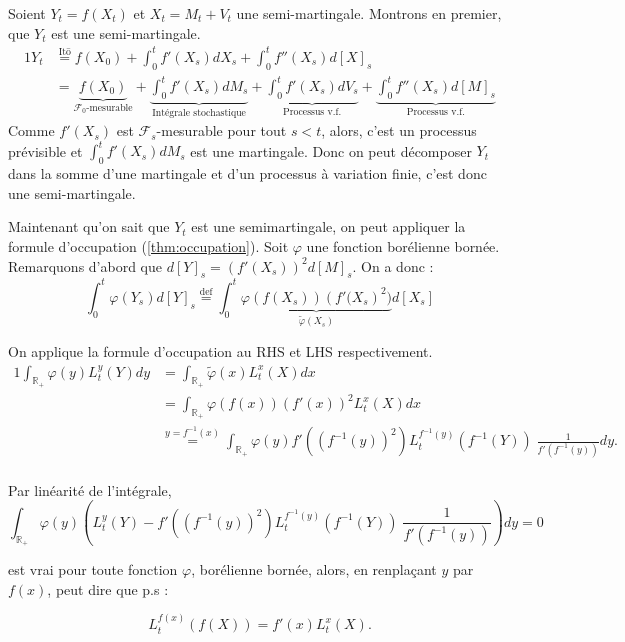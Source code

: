 \documentclass[openany]{book}
\makeatletter
\newcommand{\F}{\mathscr{F}}
\newcommand{\R}{\mathbb{R}}
\newcommand{\1}{\mathbbm{1}}
\renewenvironment{proof}[1][\textbf{\textit{Démonstration}}]{%
  \par\pushQED{\qed}%
  \normalfont\itshape\topsep6\p@\@plus6\p@\relax
  \trivlist\item[\hskip\labelsep
    #1\@addpunct{.}]\ignorespaces
}{%
  \popQED\endtrivlist\@endpefalse
}
\theoremstyle{thmfont}
\theoremstyle{deffont}
\theoremstyle{thmfont}
\theoremstyle{deffont}
\makeatother
\begin{document}
\begin{proof}
  Soient $Y_t = f(X_t)$ et $X_t = M_t + V_t$ une semi-martingale. Montrons en premier, que $Y_t$ est une semi-martingale. 
  \begin{alignat*}{1}
    Y_t &\overset{\text{Itō}}{=} f(X_0) + \int_0^t f'(X_s) dX_s + \int_0^t f''(X_s) d[X]_s\\
        &= \underbrace{f(X_0)}_{\F_0\text{-mesurable}} + \underbrace{\int_0^t f'(X_s) dM_s}_{\text{Intégrale stochastique}} + \underbrace{\int_0^t f'(X_s) dV_s}_{\text{Processus v.f.}} + \underbrace{\int_0^t f''(X_s) d[M]_s}_{\text{Processus v.f.}}
  \end{alignat*}
  Comme $f'(X_s)$ est $\F_s$-mesurable pour tout $s<t$, alors, c'est un processus prévisible et $\int_0^t f'(X_s) dM_s$ est une martingale.
  Donc on peut décomposer $Y_t$ dans la somme d'une martingale et d'un processus à variation finie, c'est donc une semi-martingale.


  
Maintenant qu'on sait que $Y_t$ est une semimartingale, on peut appliquer la formule d'occupation (\autoref{thm:occupation}). Soit $\varphi$ une fonction borélienne bornée. Remarquons d'abord que $d[Y]_s = \left(f'(X_s)\right)^2 d[M]_s$. On a donc :
$$  \int_0^t \varphi(Y_s) d[Y]_s \overset{\text{def}}{=} \int_0^t \underbrace{\varphi(f(X_s)) \left(f'(X_s\right)^2)}_{\tilde\varphi(X_s)} d[X_s]
$$

On applique la formule d'occupation au RHS et LHS respectivement.
\begin{alignat*}{1}
\int_{\R_+} \varphi(y) L_t^y(Y) dy &= \int_{\R_+} \tilde\varphi(x) L_t^x(X) dx\\
                         &= \int_{\R_+}\varphi(f(x)) \left(f'(x)\right)^2 L_t^x(X) dx\\
                      &\overset{y = f^{-1}(x)}{=} \int_{\R_+}\varphi(y) f'( (f^{-1}(y))^2) L_t^{f^{-1}(y)}(f^{-1}(Y)) \; \frac{1}{f'(f^{-1}(y))} dy.\\
\end{alignat*}

Par linéarité de l'intégrale, 
$$\int_{\R_+} \varphi(y) \left( L_t^y(Y) -  f'\left((f^{-1}(y))^2\right) L_t^{f^{-1}(y)}(f^{-1}(Y)) \; \frac{1}{f'(f^{-1}(y))}\right) dy  = 0 $$

est vrai pour toute fonction $\varphi$, borélienne bornée, alors, en renplaçant $y$ par $f(x)$, peut dire que p.s :

$$L_t^{f(x)}(f(X)) =  f'(x) L_t^{x}(X).$$
\end{proof}
\end{document}
